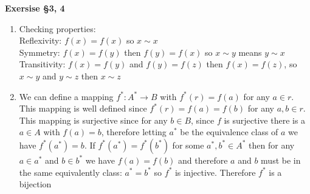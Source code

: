 \documentclass[12pt]{article}
\newenvironment{ques}[1]{\textbf{Exersise #1}\vspace{1 mm}\\ }{\bigskip}
\theoremstyle{definition}
\begin{document}
\begin{ques}{\S 3, 4}
	\begin{enumerate}
		\item
			Checking properties:\\
			Reflexivity: $f(x) = f(x)$ so $x \sim x$\\
			Symmetry: $f(x) = f(y)$ then $f(y) = f(x)$ so $x \sim y$ means $y\sim x$\\
			Transitivity: $f(x) = f(y)$ and $f(y) = f(z)$ then
			$f(x) = f(z)$, so $x \sim y$ and $y \sim z$ then $x \sim z$

		\item
			We can define a mapping $f^* : A^* \to B$ with $f^*(r)
			= f(a)$ for any $a \in r$.  This mapping is well
			defined since $f^*(r) = f(a) = f(b)$ for any $a, b \in
			r$. This mapping is surjective since for any $b \in B$,
			since $f$ is surjective there is a $a \in A$ with $f(a)
			= b$, therefore letting $a^*$ be the equivalence class
			of $a$ we have $f^*(a^*) = b$. If $f^*(a^*) = f^*(b^*)$
			for some $a^*, b^* \in A^*$ then for any $a \in a^*$
			and $b \in b^*$ we have $f(a) = f(b)$ and therefore $a$
			and $b$ must be in the same equivalently class: $a^* =
			b^*$ so $f^*$ is injective. Therefore $f^*$ is a
			bijection
			
	\end{enumerate}
\end{ques}
\end{document}
